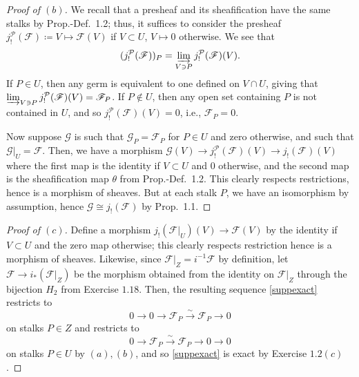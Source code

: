 \documentclass[10pt]{article}
\theoremstyle{definition}
\theoremstyle{remark}
\numberwithin{equation}{section}
\numberwithin{figure}{subsubsection}
\newcommand{\isoto}{\overset{\sim}{\to}}
\begin{document}
\begin{proof}[Proof of $(b)$]
  We recall that a presheaf and its sheafification have the same stalks by Prop.-Def.~1.2; thus, it suffices to consider the presheaf $j_!^\mathcal{P}(\mathscr{F}) \coloneqq V \mapsto \mathscr{F}(V)$ if $V \subset U$, $V \mapsto 0$ otherwise. We see that
  \begin{equation*}
    (j_!^\mathcal{P}(\mathscr{F}))_P = \varinjlim_{V \ni P} j_!^\mathcal{P}(\mathscr{F})(V).
  \end{equation*}
  If $P \in U$, then any germ is equivalent to one defined on $V \cap U$, giving that $\varinjlim_{V \ni P} j_!^\mathcal{P}(\mathscr{F})(V) = \mathscr{F}_P$. If $P \notin U$, then any open set containing $P$ is not contained in $U$, and so $j_!^\mathcal{P}(\mathscr{F})(V) = 0$, i.e., $\mathscr{F}_P = 0$.
  \par Now suppose $\mathscr{G}$ is such that $\mathscr{G}_P = \mathscr{F}_P$ for $P \in U$ and zero otherwise, and such that $\mathscr{G}\vert_U = \mathscr{F}$. Then, we have a morphism $\mathscr{G}(V) \to j_!^\mathcal{P}(\mathscr{F})(V) \to j_!(\mathscr{F})(V)$ where the first map is the identity if $V \subset U$ and $0$ otherwise, and the second map is the sheafification map $\theta$ from Prop.-Def.~1.2. This clearly respects restrictions, hence is a morphism of sheaves. But at each stalk $P$, we have an isomorphism by assumption, hence $\mathscr{G} \cong j_!(\mathscr{F})$ by Prop.~1.1.
\end{proof}
\begin{proof}[Proof of $(c)$]
  Define a morphism $j_!(\mathscr{F}\vert_U)(V) \to \mathscr{F}(V)$ by the
  identity if $V \subset U$ and the zero map otherwise; this clearly respects
  restriction hence is a morphism of sheaves. Likewise, since
  $\mathscr{F}\vert_Z = i^{-1}\mathscr{F}$ by definition, let $\mathscr{F} \to
  i_*(\mathscr{F}\vert_Z)$ be the morphism obtained from the identity on
  $\mathscr{F}\vert_Z$ through the bijection $H_2$ from Exercise $1.18$. Then, the resulting sequence \eqref{suppexact} restricts to
  \begin{equation*}
    0 \to 0 \to \mathscr{F}_P \isoto \mathscr{F}_P \to 0
  \end{equation*}
  on stalks $P \in Z$ and restricts to
  \begin{equation*}
    0 \to \mathscr{F}_P \isoto \mathscr{F}_P \to 0 \to 0
  \end{equation*}
  on stalks $P \in U$ by $(a),(b)$, and so \eqref{suppexact} is exact by
  Exercise $1.2(c)$.
\end{proof}
\end{document}
